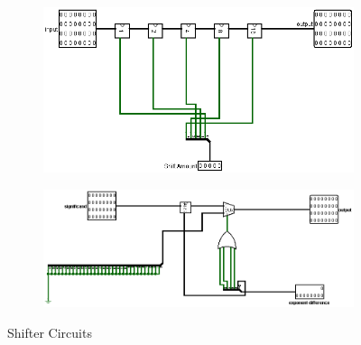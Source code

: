 \documentclass[a4paper,12pt]{article}
\begin{document}
\begin{figure}[H]
\begin{subfigure}[b]{0.3\textwidth}
    \end{subfigure}
    \hfill
    \begin{subfigure}[b]{0.3\textwidth}
        \centering
        \includegraphics[width=\linewidth]{Arbitary RightShifter.png}
    \end{subfigure}
    \newline
    \newline
    \hfill
    \begin{subfigure}[b]{0.3\textwidth}
        \centering
        \includegraphics[width=\linewidth]{Right_Shifter.png}
    \end{subfigure}
    \caption{Shifter Circuits}

\end{figure}

\pagebreak
\end{document}
